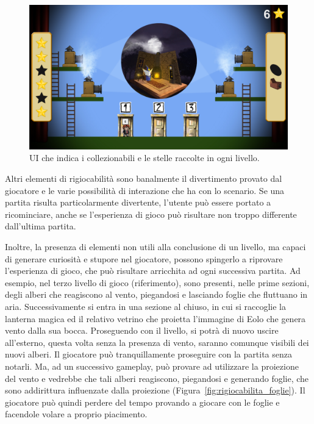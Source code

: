 \begin{figure}%
	\centering
	\includegraphics[width= 0.9\columnwidth]{images/gameDesign/26_hub.jpg}
	\caption{UI che indica i collezionabili e le stelle raccolte in ogni livello.}
	\label{fig:rigiocabilita_UI_hub}
\end{figure} 

Altri elementi di rigiocabilità sono banalmente il divertimento provato dal giocatore e le varie possibilità di interazione che ha con lo scenario.
Se una partita risulta particolarmente divertente, l’utente può essere portato a ricominciare, anche se l’esperienza di gioco può risultare non troppo differente dall’ultima partita.

Inoltre, la presenza di elementi non utili alla conclusione di un livello, ma capaci di generare curiosità e stupore nel giocatore, possono spingerlo a riprovare l’esperienza di gioco, che può risultare arricchita ad ogni successiva partita.
Ad esempio, nel terzo livello di gioco (riferimento), sono presenti, nelle prime sezioni, degli alberi che reagiscono al vento, piegandosi e lasciando foglie che fluttuano in aria. Successivamente si entra in una sezione al chiuso, in cui si raccoglie la lanterna magica ed il relativo vetrino che proietta l’immagine di Eolo che genera vento dalla sua bocca. Proseguendo con il livello, si potrà di nuovo uscire all’esterno, questa volta senza la presenza di vento, saranno comunque visibili dei nuovi alberi. Il giocatore può tranquillamente proseguire con la partita senza notarli. Ma, ad un successivo gameplay, può provare ad utilizzare la proiezione del vento e vedrebbe che tali alberi reagiscono, piegandosi e generando foglie, che sono addirittura influenzate dalla proiezione (Figura~\ref{fig:rigiocabilita_foglie}). Il giocatore può quindi perdere del tempo provando a giocare con le foglie e facendole volare a proprio piacimento.

